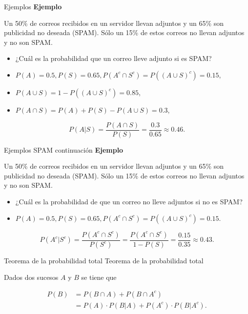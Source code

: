 \documentclass[
  ignorenonframetext,
]{beamer}
\providecommand{\tightlist}{%
  \setlength{\itemsep}{0pt}\setlength{\parskip}{0pt}}
\begin{document}
\begin{frame}{Ejemplos}
\protect\hypertarget{ejemplos-3}{}
\textbf{Ejemplo}

Un 50\% de correos recibidos en un servidor llevan adjuntos y un 65\%
son publicidad no deseada (SPAM). Sólo un 15\% de estos correos no
llevan adjuntos y no son SPAM.

\begin{itemize}
\tightlist
\item
  ¿Cuál es la probabilidad que un correo lleve adjunto si es SPAM?
\end{itemize}

\begin{itemize}
\item
  \(P(A)=0.5, P(S)=0.65, P(A^c\cap S^c)=P((A\cup S)^c)=0.15\),
\item
  \(P(A\cup S)=1-P((A\cup S)^c)=0.85\),
\item
  \(P(A\cap S)=P(A)+P(S)-P(A\cup S)=0.3\),
\end{itemize}

\[P(A|S)=\dfrac{P(A\cap S)}{P(S)}=\dfrac{0.3}{0.65}\approx 0.46.\]
\end{frame}

\begin{frame}{Ejemplos SPAM continuación}
\protect\hypertarget{ejemplos-spam-continuaciuxf3n}{}
\textbf{Ejemplo}

Un 50\% de correos recibidos en un servidor llevan adjuntos y un 65\%
son publicidad no deseada (SPAM). Sólo un 15\% de estos correos no
llevan adjuntos y no son SPAM.

\begin{itemize}
\tightlist
\item
  ¿Cuál es la probabilidad de que un correo no lleve adjuntos si no es
  SPAM?
\end{itemize}

\begin{itemize}
\tightlist
\item
  \(P(A)=0.5, P(S)=0.65, P(A^c\cap S^c)=P((A\cup S)^c)=0.15.\)
\end{itemize}

\[P(A^c|S^c)=\dfrac{P(A^c\cap S^c)}{P(S^c)}=\dfrac{P(A^c\cap S^c)}{1-P(S)}=\dfrac{0.15}{0.35}\approx 0.43.\]
\end{frame}

\begin{frame}{Teorema de la probabilidad total}
\protect\hypertarget{teorema-de-la-probabilidad-total}{}
Teorema de la probabilidad total

Dados dos sucesos \(A\) y \(B\) se tiene que

\[
\begin{array}{rl}
P(B)&= P(B\cap A) +P(B\cap A^c)\\
& =P(A)\cdot P(B|A)+ P(A^c)\cdot P(B|A^c).
\end{array}
\]
\end{frame}
\end{document}
